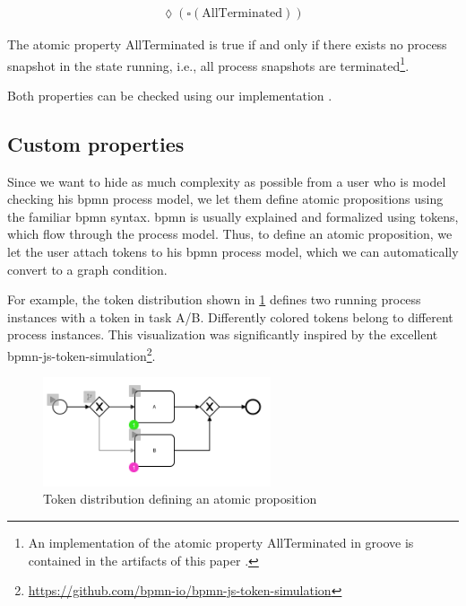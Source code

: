 \documentclass[adraft, copyright, creativecommons]{eptcs} %
\begin{document}
\begin{align}
    \lozenge (\square(\text{AllTerminated})) \label{eq:soundness}
\end{align}

The atomic property \textsf{AllTerminated} is true if and only if there exists no process snapshot in the state running, i.e., all process snapshots are terminated\footnote{An implementation of the atomic property \textsf{AllTerminated} in groove is contained in the artifacts of this paper \cite{ArtifactsTERMGRAPH2022}.}.

Both properties can be checked using our implementation \cite{ArtifactsTERMGRAPH2022}.
\subsection{Custom properties}

Since we want to hide as much complexity as possible from a user who is model checking his \gls*{bpmn} process model, we let them define atomic propositions using the familiar \gls*{bpmn} syntax.
\gls*{bpmn} is usually explained and formalized using tokens, which flow through the process model.
Thus, to define an atomic proposition, we let the user attach tokens to his \gls*{bpmn} process model, which we can automatically convert to a graph condition.

For example, the token distribution shown in \cref{fig:atomicProposition} defines two running process instances with a token in task A/B.
Differently colored tokens belong to different process instances.
This visualization was significantly inspired by the excellent bpmn-js-token-simulation\footnote{\url{https://github.com/bpmn-io/bpmn-js-token-simulation}}.

\begin{figure}[h]
    \centering
    \includegraphics[width=0.6\textwidth]{images/atomicProposition.png}
    \caption{Token distribution defining an atomic proposition}
    \label{fig:atomicProposition}
\end{figure}
\end{document}
